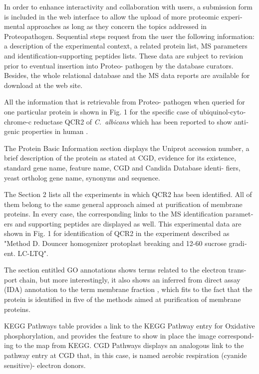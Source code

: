 \begin{otherlanguage}{british}
In order to enhance interactivity and collaboration
with users, a submission form is included in the web
interface to allow the upload of more proteomic experimental
 approaches as long as they concern the topics
addressed in Proteopathogen. Sequential steps request from
the user the following information: a description of the
experimental context, a related protein list, MS parameters
and identification-supporting peptides lists. These data are
subject to revision prior to eventual insertion into Proteo-
pathogen by the database curators. Besides, the whole relational
 database and the MS data reports are available for
download at the web site.

All the information that is retrievable from Proteo-
pathogen when queried for one particular protein is shown
in Fig. 1 for the specific case of ubiquinol-cytochrome-c
reductase QCR2 of \textit{\mbox{C. albicans}} which has been reported to
show antigenic properties in human \citep{Pitarch2004}.

The Protein Basic Information section displays the
Uniprot accession number, a brief description of the protein
as stated at CGD, evidence for its existence, standard gene
name, feature name, CGD and Candida Database identi-
fiers, yeast ortholog gene name, synonyms and sequence.

The Section 2 lists all the experiments in which QCR2
has been identified. All of them belong to the same general
approach aimed at purification of membrane proteins. In
every case, the corresponding links to the MS identification
parameters and supporting peptides are displayed as well.
This experimental data are shown in Fig. 1 for identification
of QCR2 in the experiment described as "Method D.
Douncer homogenizer protoplast breaking and 12-60%
sucrose gradient. LC-LTQ".

The section entitled GO annotations shows terms related
to the electron transport chain, but more interestingly, it
also shows an inferred from direct assay (IDA) annotation to
the term membrane fraction \citep{Insenser2006}, which fits to the fact that
the protein is identified in five of the methods aimed at
purification of membrane proteins.

KEGG Pathways table provides a link to the KEGG
Pathway entry for Oxidative phosphorylation, and provides
the feature to show in place the image corresponding to the
map from KEGG. CGD Pathways displays an analogous link
to the pathway entry at CGD that, in this case, is named
aerobic respiration (cyanide sensitive)- electron donors.


\end{otherlanguage}
